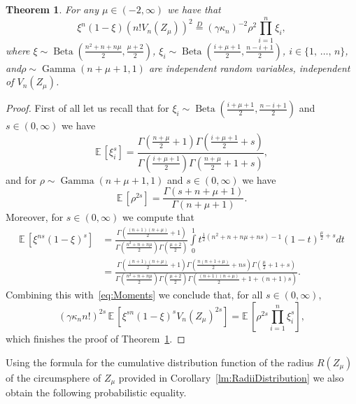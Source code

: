 \documentclass[10pt]{amsart}
\newtheorem{theo}{Theorem}[section]
\theoremstyle{definition}\newtheorem{defi}[theo]{Definition}\newtheorem{rema}[theo]{Remark}\newtheorem{exam}[theo]{Example}\newtheorem{exem}[theo]{Example}\newtheorem{nota}[theo]{Notation}
\newcommand{\EE}{\mathbb{E}\,}
\newcommand{\Gam}{\mathop{\mathrm{Gamma}}\nolimits}
\newcommand{\Bet}{\mathop{\mathrm{Beta}}\nolimits}
\newcommand{\eqdistr}{\stackrel{D}{=}}
\begin{document}
\begin{theo}\label{thm:ProbabilisticRepresentation}
For any $\mu\in(-2,\infty)$ we have that
\[
\xi^n(1-\xi)\left(n!V_n(Z_{\mu})\right)^2\eqdistr (\gamma\kappa_n)^{-2}\rho^2\prod\limits_{i=1}^n\xi_i,
\]
where $\xi\sim\Bet(\frac{n^2+n+n\mu}{2}, \frac{\mu+2}{2})$, $\xi_i\sim\Bet(\frac{i+\mu+1}{2}, \frac{n-i+1}{2})$, $i\in\{1,\,\ldots,\,n\}$, and\linebreak$\rho\sim\Gam(n+\mu+1,1)$ are independent random variables, independent of $V_n(Z_{\mu})$.
\end{theo}

\begin{proof}
First of all let us recall that for $\xi_i\sim\Bet(\frac{i+\mu+1}{2}, \frac{n-i+1}{2})$ and $s\in(0,\infty)$ we have
\[
\EE[\xi_i^{s}]=\frac{\Gamma\left(\frac{n+\mu}{2}+1\right)\Gamma\left(\frac{i+\mu+1}{2}+s\right)}{\Gamma\left(\frac{i+\mu+1}{2}\right)\Gamma\left(\frac{n+\mu}{2}+1+s\right)},
\]
and for $\rho\sim\Gam(n+\mu+1,1)$ and $s\in(0,\infty)$ we have
\[
\EE\left[\rho^{2s}\right]=\frac{\Gamma(s+n+\mu+1)}{\Gamma(n+\mu+1)}.
\]
Moreover, for $s\in(0,\infty)$ we compute that
\begin{align*}
\EE\left[\xi^{ns}(1-\xi)^s\right]&=\frac{\Gamma\left(\frac{(n+1)(n+\mu)}{2}+1\right)}{\Gamma\left(\frac{n^2+n+n\mu}{2}\right)\Gamma\left(\frac{\mu+2}{2}\right)}\int\limits_{0}^1t^{\frac{1}{2}(n^2+n+n\mu+ns)-1}(1-t)^{\frac{\mu}{2} +s}dt\\
&=\frac{\Gamma\left(\frac{(n+1)(n+\mu)}{2}+1\right)\Gamma\left(\frac{n(n+1+\mu)}{2}+ns\right)\Gamma\left(\frac{\mu}{2}+1+s\right)}{\Gamma\left(\frac{n^2+n+n\mu}{2}\right)\Gamma\left(\frac{\mu+2}{2}\right)\Gamma\left(\frac{(n+1)(n+\mu)}{2}+1+(n+1)s\right)}.
\end{align*}
Combining this with~\eqref{eq:Moments} we conclude that, for all $s\in(0,\infty)$,
\[
(\gamma\kappa_n n!)^{2s}\,\EE\left[\xi^{sn}(1-\xi)^sV_n(Z_{\mu})^{2s}\right]=\EE\left[\rho^{2s}\prod\limits_{i=1}^n\xi_i^s\right],
\]
which finishes the proof of Theorem~\ref{thm:ProbabilisticRepresentation}.
\end{proof}

Using the formula for the cumulative distribution function of the radius $R(Z_{\mu})$ of the circumsphere of $Z_{\mu}$ provided in Corollary~\ref{lm:RadiiDistribution} we also obtain the following probabilistic equality.
\end{document}
